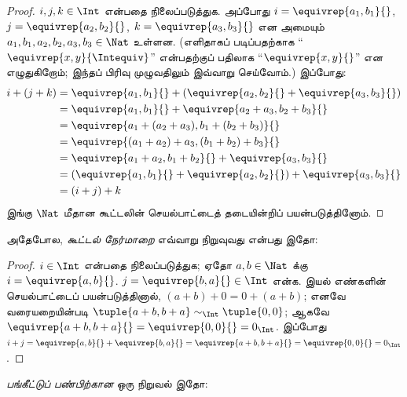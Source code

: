 \documentclass[../../../include/open-logic-section]{subfiles}
\begin{document}
\begin{proof}
$i, j, k \in \Int$ என்பதை நிலைப்படுத்துக.
அப்போது $i = \equivrep{a_1, b_1}{}$, $j =
\equivrep{a_2,b_2}{}$, $k = \equivrep{a_3, b_3}{}$ என அமையும்
$a_1, b_1, a_2, b_2, a_3, b_3 \in \Nat$ உள்ளன.
(எளிதாகப் படிப்பதற்காக ``$\equivrep{x, y}{\Intequiv}$'' என்பதற்குப்
பதிலாக ``$\equivrep{x, y}{}$'' என எழுதுகிறோம்;
இந்தப் பிரிவு முழுவதிலும் இவ்வாறு செய்வோம்.) இப்போது:
\begin{align*}
	i + (j + k) &= \equivrep{a_1, b_1}{}+(\equivrep{a_2, b_2}{} + \equivrep{a_3, b_3}{}) \\
	&= \equivrep{a_1,  b_1}{} + \equivrep{a_2+a_3, b_2+b_3}{}\\
	&= \equivrep{a_1 + (a_2 + a_3), b_1 + (b_2 + b_3)}{}\\
	&= \equivrep{(a_1 + a_2) + a_3, (b_1 + b_2) + b_3}{}\\
	&= \equivrep{a_1 + a_2, b_1 + b_2}{} + \equivrep{a_3, b_3}{}\\
	&= (\equivrep{a_1, b_1}{} + \equivrep{a_2, b_2}{}) + \equivrep{a_3, b_3}{}\\
	&= (i+j) + k
\end{align*}
இங்கு $\Nat$ மீதான கூட்டலின் செயல்பாட்டைத் தடையின்றிப் பயன்படுத்தினோம்.
\end{proof}

அதேபோல, \emph{கூட்டல் நேர்மாறை} எவ்வாறு நிறுவுவது என்பது இதோ:

\begin{proof}
$i \in \Int$ என்பதை நிலைப்படுத்துக;
ஏதோ $a,b \in \Nat$ க்கு $i = \equivrep{a,b}{}$.
$j = \equivrep{b,a}{} \in \Int$ என்க.
இயல் எண்களின் செயல்பாட்டைப் பயன்படுத்தினால்,
$(a+b) + 0 = 0 + (a+b)$; எனவே வரையறையின்படி
$\tuple{a+b, b+a} \sim_\Int \tuple{0,0}$;
ஆகவே $\equivrep{a+b, b+a}{} = \equivrep{0, 0}{} = 0_\Int$.
இப்போது $i + j =
\equivrep{a,b}{}+\equivrep{b,a}{}=\equivrep{a+b, b+a}{}= \equivrep{0,
0}{} = 0_\Int$.
\end{proof}

\emph{பங்கீட்டுப் பண்பிற்கான} ஒரு நிறுவல் இதோ:
\end{document}
